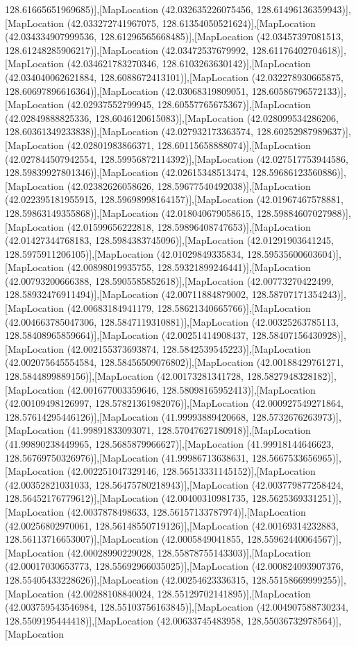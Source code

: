 128.61665651969685)],[MapLocation (42.032635226075456, 128.61496136359943)],[MapLocation (42.033272741967075, 128.61354050521624)],[MapLocation (42.034334907999536, 128.61296565668485)],[MapLocation (42.03457397081513, 128.61248285906217)],[MapLocation (42.03472537679992, 128.61176402704618)],[MapLocation (42.034621783270346, 128.6103263630142)],[MapLocation (42.034040062621884, 128.6088672413101)],[MapLocation (42.032278930665875, 128.60697896616364)],[MapLocation (42.03068319809051, 128.60586796572133)],[MapLocation (42.02937552799945, 128.60557765675367)],[MapLocation (42.02849888825336, 128.6046120615083)],[MapLocation (42.028099534286206, 128.60361349233838)],[MapLocation (42.027932173363574, 128.60252987989637)],[MapLocation (42.02801983866371, 128.60115658888074)],[MapLocation (42.027844507942554, 128.59956872114392)],[MapLocation (42.027517753944586, 128.59839927801346)],[MapLocation (42.02615348513474, 128.59686123560886)],[MapLocation (42.02382626058626, 128.59677540492038)],[MapLocation (42.022395181955915, 128.59698998164157)],[MapLocation (42.01967467578881, 128.59863149355868)],[MapLocation (42.018040679058615, 128.59884607027988)],[MapLocation (42.01599656222818, 128.59896408747653)],[MapLocation (42.01427344768183, 128.5984383745096)],[MapLocation (42.01291903641245, 128.5975911206105)],[MapLocation (42.01029849335834, 128.59535600603604)],[MapLocation (42.00898019935755, 128.59321899246441)],[MapLocation (42.00793200666388, 128.5905585852618)],[MapLocation (42.00773270422499, 128.58932476911494)],[MapLocation (42.00711884879002, 128.58707171354243)],[MapLocation (42.00683184941179, 128.58621340665766)],[MapLocation (42.004663785047306, 128.5847119310881)],[MapLocation (42.00325263785113, 128.58408965859664)],[MapLocation (42.00251414908437, 128.58407156430928)],[MapLocation (42.002155373693874, 128.5842539545223)],[MapLocation (42.002075645554584, 128.58456509076802)],[MapLocation (42.00188429761271, 128.5844899889156)],[MapLocation (42.00173281341728, 128.5827948328182)],[MapLocation (42.001677003359646, 128.58098165952413)],[MapLocation (42.00109498126997, 128.57821361982076)],[MapLocation (42.000927549271864, 128.57614295446126)],[MapLocation (41.99993889420668, 128.5732676263973)],[MapLocation (41.99891833093071, 128.57047627180918)],[MapLocation (41.99890238449965, 128.5685879966627)],[MapLocation (41.99918144646623, 128.56769750326976)],[MapLocation (41.99986713638631, 128.5667533656965)],[MapLocation (42.002251047329146, 128.56513331145152)],[MapLocation (42.00352821031033, 128.56475780218943)],[MapLocation (42.003779877258424, 128.56452176779612)],[MapLocation (42.00400310981735, 128.5625369331251)],[MapLocation (42.0037878498633, 128.56157133787974)],[MapLocation (42.00256802970061, 128.56148550719126)],[MapLocation (42.00169314232883, 128.56113716653007)],[MapLocation (42.0005849041855, 128.55962440064567)],[MapLocation (42.00028990229028, 128.55878755143303)],[MapLocation (42.00017030653773, 128.55692966035025)],[MapLocation (42.000824093907376, 128.55405433228626)],[MapLocation (42.00254623336315, 128.55158669999255)],[MapLocation (42.00288108840024, 128.55129702141895)],[MapLocation (42.003759543546984, 128.55103756163845)],[MapLocation (42.004907588730234, 128.5509195444418)],[MapLocation (42.00633745483958, 128.55036732978564)],[MapLocation 